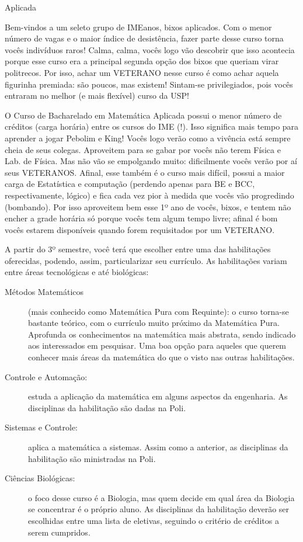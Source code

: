 \begin{subsecao}{Aplicada}

Bem-vindos a um seleto grupo de IMEanos, bixos aplicados. Com o menor número de
vagas e o maior índice de desistência, fazer parte desse curso torna vocês
indivíduos raros!  Calma, calma, vocês logo vão descobrir que isso acontecia
porque esse curso era a principal segunda opção dos bixos que queriam virar
politrecos. Por isso, achar um VETERANO nesse curso é como achar aquela
figurinha premiada: são poucos, mas existem! Sintam-se privilegiados, pois vocês
entraram no melhor (e mais flexível) curso da USP!

O Curso de Bacharelado em Matemática Aplicada possui o menor número de créditos
(carga horária) entre os cursos do IME (!). Isso significa mais tempo para
aprender a jogar Pebolim e King! Vocês logo verão como a vivência está sempre
cheia de seus colegas.  Aproveitem para se gabar por vocês não terem Física e
Lab. de Física. Mas não vão se empolgando muito: dificilmente vocês verão por aí
seus VETERANOS. Afinal, esse também é o curso mais difícil, possui a maior carga
de Estatística e computação (perdendo apenas para BE e BCC, respectivamente,
lógico) e fica cada vez pior à medida que vocês vão progredindo (bombando). Por
isso aproveitem bem esse 1º ano de vocês, bixos, e tentem não encher a grade
horária só porque vocês tem algum tempo livre; afinal é bom vocês estarem
disponíveis quando forem requisitados por um VETERANO.

A partir do 3º semestre, você terá que escolher entre uma das habilitações
oferecidas, podendo, assim, particularizar seu currículo. As habilitações variam
entre áreas tecnológicas e até biológicas:
\begin{description}
\item [Métodos Matemáticos] (mais conhecido como Matemática Pura com Requinte):
  o curso torna-se bastante teórico, com o currículo muito próximo da Matemática
  Pura. Aprofunda os conhecimentos na matemática mais abstrata, sendo indicado
  aos interessados em pesquisar. Uma boa opção para aqueles que querem conhecer
  mais áreas da matemática do que o visto nas outras habilitações.
\item [Controle e Automação:] estuda a aplicação da matemática em alguns
  aspectos da engenharia. As disciplinas da habilitação são dadas na Poli.
\item [Sistemas e Controle:] aplica a matemática a sistemas. Assim como a
  anterior, as disciplinas da habilitação são ministradas na Poli.
\item [Ciências Biológicas:] o foco desse curso é a Biologia, mas quem decide em
  qual área da Biologia se concentrar é o próprio aluno. As disciplinas da
  habilitação deverão ser escolhidas entre uma lista de eletivas, seguindo o
  critério de créditos a serem cumpridos.
\end{description}


\end{subsecao}
